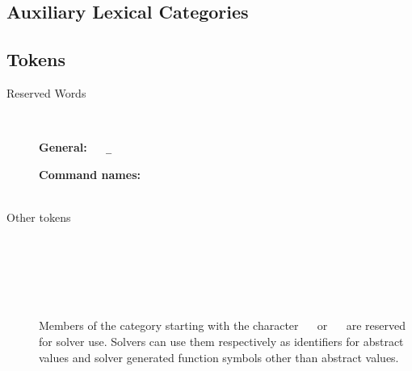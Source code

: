 {\begin{minipage}{.95\linewidth}
\end{minipage}

\subsection*{Auxiliary Lexical Categories}

\aLexical

\newpage
\subsection*{Tokens}

\begin{description}

\item[Reserved Words]
\ 
\medskip

\begin{minipage}{.95\linewidth}
\textbf{General:} \ 
\ter{!} \ 
\verb|_| \ 
 \ 
 \ 
 \ 
 \ 
 \ 
 \ 
 \ 
 \ 
 \ 
 \ 
\medskip


\textbf{Command names:}
\ter{assert} \ 
 \ 
 \ 
 \ 
 \ 
 \ 
 \ 
 \ 
 \ 
 \ 
 \ 
 \ 
 \ 
 \ 
 \ 
 \ 
 \ 
 \ 
 \ 
 \ 
 \ 
 \ 
 \ 
 \ 
 \ 
 \ 
 \ 
 \ 
 \ 
 \ 
\end{minipage}
\medskip


\item[Other tokens]
\ 
\medskip

\ \ter{(} 

\ \ter{)}

\tokens
\medskip

\noindent
Members of the \nter{symbol} category starting with the character
\ \ter{@} \ or \  \  are reserved for solver use.
Solvers can use them respectively as identifiers for abstract values and
solver generated function symbols other than abstract values.
\end{description}


}
